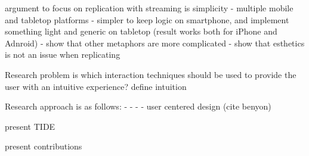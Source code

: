 argument to focus on replication with streaming is simplicity
- multiple mobile and tabletop platforms
- simpler to keep logic on smartphone, and implement something light and generic on tabletop (result works both for iPhone and Adnroid)
- show that other metaphors are more complicated
- show that esthetics is not an issue when replicating

Research problem is which interaction techniques should be used to provide the user with an intuitive experience?
define intuition

Research approach is as follows:
-
-
-
- user centered design (cite benyon)

present TIDE

present contributions



